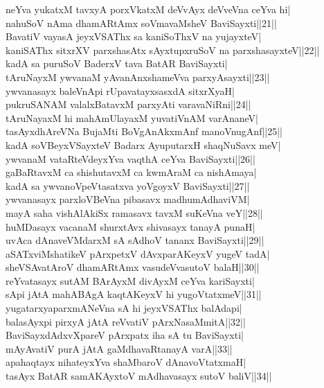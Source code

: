 \documentclass{article}
\begin{document}
neYva yukatxM tavxyA porxVkatxM deVvAyx deVveVna ceYva hi|\\
nahuSoV nAma dhamARtAmx soVmavaMsheV BaviSayxti||21||\\
BavatiV vayasA jeyxVSAThx sa kaniSoThxV na yujayxteV|\\
kaniSAThx sitxrXV parxshasAtx sAyxtupxruSoV na parxshasayxteV||22||\\
kadA sa puruSoV BaderxV tava BatAR BaviSayxti|\\
tAruNayxM ywvanaM yAvanAnxshameVva parxyAsayxti||23||\\
ywvanasayx baleVnApi rUpavatayxsasxdA sitxrXyaH|\\
pukruSANAM valalxBatavxM parxyAti varavaNiRni||24||\\
tAruNayaxM hi mahAmUlayaxM yuvatiVnAM varAnaneV|\\
tasAyxdhAreVNa BujaMti BoVgAnAkxmAnf manoVnugAnf||25||\\
kadA soVBeyxVSayxteV Badarx AyuputarxH shaqNuSavx meV|\\
ywvanaM vataRteVdeyxYva vaqthA ceYva BaviSayxti||26||\\
gaBaRtavxM ca shishutavxM ca kwmAraM ca nishAmaya|\\
kadA sa ywvanoVpeVtasatxva yoVgoyxV BaviSayxti||27||\\
ywvanasayx parxloVBeVna pibasavx madhumAdhaviVM|\\
mayA saha vishAlAkiSx ramasavx tavxM suKeVna veY||28||\\
huMDasayx vacanaM shurxtAvx shivasayx tanayA punaH|\\
uvAca dAnaveVMdarxM sA sAdhoV tananx BaviSayxti||29||\\
aSATxviMshatikeV pArxpetxV dAvxparAKeyxV yugeV tadA|\\
sheVSAvatAroV dhamARtAmx vasudeVvasutoV balaH||30||\\
reYvatasayx sutAM BArAyxM divAyxM ceYva kariSayxti|\\
sApi jAtA mahABAgA kaqtAKeyxV hi yugoVtatxmeV||31||\\
yugatarxyaparxmANeVna sA hi jeyxVSAThx balAdapi|\\
balasAyxpi pirxyA jAtA reVvatiV pArxNasaMmitA||32||\\
BaviSayxdAdxvXpareV pArxpatx iha sA tu BaviSayxti|\\
mAyAvatiV purA jAtA gaMdhavaRtanayA varA||33||\\
apahaqtayx nihateyxYva shaMbaroV dAnavoVtatxmaH|\\
tasAyx BatAR samAKAyxtoV mAdhavasayx sutoV baliV||34||\\
\end{document}
